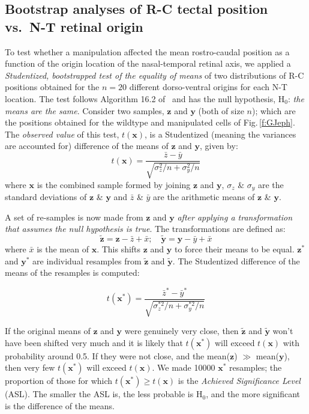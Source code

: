 \documentclass[11pt, a4paper]{article}
\begin{document}
\subsection*{Bootstrap analyses of R-C tectal position vs.~N-T retinal origin}

To test whether a manipulation affected the mean rostro-caudal position as a function of the origin location of the nasal-temporal retinal axis, we applied a \emph{Studentized, bootstrapped test of the equality of means} of two distributions of R-C positions obtained for the $n=20$ different dorso-ventral origins for each N-T location. 
The test follows Algorithm 16.2 of~\cite{efron_introduction_1993} and has the null hypothesis, H$_0$: \emph{the means are the same}.
Consider two samples, $\textbf{z}$ and $\textbf{y}$ (both of size $n$); which are the positions obtained for the wildtype and manipulated cells of Fig.\,\ref{f:GJeph}.
The \emph{observed value} of this test, $t(\textbf{x})$, is a Studentized (meaning the variances are accounted for) difference of the means of $\textbf{z}$ and $\textbf{y}$, given by:
%
$$t(\textbf{x}) =  \frac{\bar{z} - \bar{y}}{\sqrt{\sigma_{z}^2/n + \sigma_{y}^2/n} } $$
%
where $\textbf{x}$ is the combined sample formed by joining $\textbf{z}$ and $\textbf{y}$, $\sigma_z$ \& $\sigma_y$ are the standard deviations of $\textbf{z}$ \& $\textbf{y}$ and $\bar{z}$ \& $\bar{y}$ are the arithmetic means of $\textbf{z}$ \& $\textbf{y}$.

A set of re-samples is now made from $\textbf{z}$ and $\textbf{y}$ \emph{after applying a transformation that assumes the null hypothesis is true}.
The transformations are defined as:
%
$$ \tilde{\textbf{z}} = \textbf{z} - \bar{z} + \bar{x}; \quad \tilde{\textbf{y}} = \textbf{y} - \bar{y} + \bar{x} $$
%
where $\bar{x}$ is the mean of $\textbf{x}$. This shifts $\textbf{z}$ and $\textbf{y}$ to force their means to be equal.
$\textbf{z}^*$ and $\textbf{y}^*$ are individual resamples from $\tilde{\textbf{z}}$ and $\tilde{\textbf{y}}$. 
The Studentized difference of the means of the resamples is computed:

$$t(\textbf{x}^*) =  \frac{\bar{z}^* - \bar{y}^*}{\sqrt{\sigma_{z}^{*2}/n + \sigma_{y}^{*2}/n} } $$

If the original means of $\textbf{z}$ and $\textbf{y}$ were genuinely very close, then $\tilde{\textbf{z}}$ and $\tilde{\textbf{y}}$ won't have been shifted very much and it is likely that $t(\textbf{x}^*)$ will exceed $t(\textbf{x})$ with probability around 0.5.
If they were not close, and the mean($\textbf{z}$) $\gg$ mean($\textbf{y}$), then very few $t(\textbf{x}^*)$ will exceed $t(\textbf{x})$. 
We made 10000 $\textbf{x}^*$ resamples; the proportion of those for which $t(\textbf{x}^*) \geq t(\textbf{x})$ is the \emph{Achieved Significance Level} (ASL). 
The smaller the ASL is, the less probable is H$_0$, and the more significant is the difference of the means.
\end{document}
